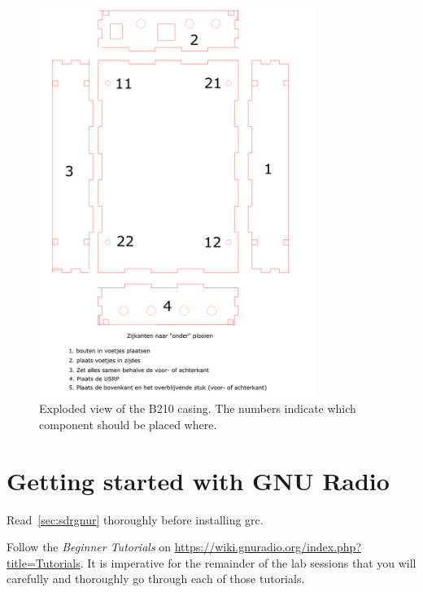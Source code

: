 \begin{figure}
    \centering
    \includegraphics[clip, trim=0mm 50mm 0mm 0mm, width=0.8\textwidth]{figs/assemble_case.pdf}\caption{Exploded view of the B210 casing. The numbers indicate which component should be placed where.}\label{fig:b210-case}
\end{figure}

\section{Getting started with GNU Radio}


Read~\cref{sec:sdrgnur} thoroughly before installing \gls{grc}.

Follow the \textit{Beginner Tutorials} on \url{https://wiki.gnuradio.org/index.php?title=Tutorials}. It is imperative for the remainder of the lab sessions that you will carefully and thoroughly go through each of those tutorials. 



